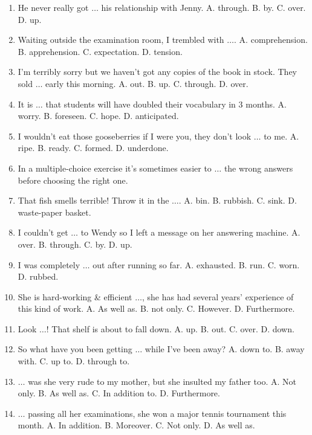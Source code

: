 \documentclass{article}
\numberwithin{equation}{section}
\begin{document}
\begin{enumerate}[leftmargin=2mm]
	\item He never really got $\ldots$ his relationship with Jenny. {\sf A.} through. {\sf B.} by. {\sf C.} over. {\sf D.} up.
	\item Waiting outside the examination room, I trembled with $\ldots$. {\sf A.} comprehension. {\sf B.} apprehension. {\sf C.} expectation. {\sf D.} tension.
	\item I'm terribly sorry but we haven't got any copies of the book in stock. They sold $\ldots$ early this morning. {\sf A.} out. {\sf B.} up. {\sf C.} through. {\sf D.} over.
	\item It is $\ldots$ that students will have doubled their vocabulary in 3 months. {\sf A.} worry. {\sf B.} foreseen. {\sf C.} hope. {\sf D.} anticipated.
	\item I wouldn't eat those gooseberries if I were you, they don't look $\ldots$ to me. {\sf A.} ripe. {\sf B.} ready. {\sf C.} formed. {\sf D.} underdone.
	\item In a multiple-choice exercise it's sometimes easier to $\ldots$ the wrong answers before choosing the right one.
	\item That fish smells terrible! Throw it in the $\ldots$. {\sf A.} bin. {\sf B.} rubbish. {\sf C.} sink. {\sf D.} waste-paper basket.
	\item I couldn't get $\ldots$ to Wendy so I left a message on her answering machine. {\sf A.} over. {\sf B.} through. {\sf C.} by. {\sf D.} up.
	\item I was completely $\ldots$ out after running so far. {\sf A.} exhausted. {\sf B.} run. {\sf C.} worn. {\sf D.} rubbed.
	\item She is hard-working \& efficient $\ldots$, she has had several years' experience of this kind of work. {\sf A.} As well as. {\sf B.} not only. {\sf C.} However. {\sf D.} Furthermore.
	\item Look $\ldots$! That shelf is about to fall down. {\sf A.} up. {\sf B.} out. {\sf C.} over. {\sf D.} down.
	\item So what have you been getting $\ldots$ while I've been away? {\sf A.} down to. {\sf B.} away with. {\sf C.} up to. {\sf D.} through to.
	\item $\ldots$ was she very rude to my mother, but she insulted my father too. {\sf A.} Not only. {\sf B.} As well as. {\sf C.} In addition to. {\sf D.} Furthermore.
	\item $\ldots$ passing all her examinations, she won a major tennis tournament this month. {\sf A.} In addition. {\sf B.} Moreover. {\sf C.} Not only. {\sf D.} As well as.

\end{enumerate}
\end{document}
